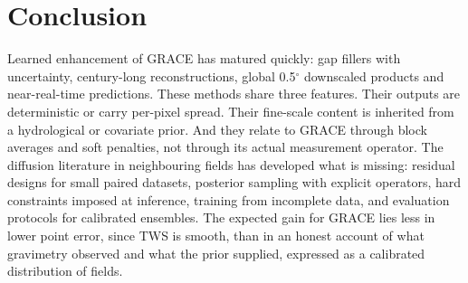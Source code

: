 \section{Conclusion}
\label{sec:conclusion}

Learned enhancement of GRACE has matured quickly: gap fillers with uncertainty, century-long reconstructions, global 0.5$^\circ$ downscaled products and near-real-time predictions. These methods share three features. Their outputs are deterministic or carry per-pixel spread. Their fine-scale content is inherited from a hydrological or covariate prior. And they relate to GRACE through block averages and soft penalties, not through its actual measurement operator. The diffusion literature in neighbouring fields has developed what is missing: residual designs for small paired datasets, posterior sampling with explicit operators, hard constraints imposed at inference, training from incomplete data, and evaluation protocols for calibrated ensembles. The expected gain for GRACE lies less in lower point error, since TWS is smooth, than in an honest account of what gravimetry observed and what the prior supplied, expressed as a calibrated distribution of fields.
